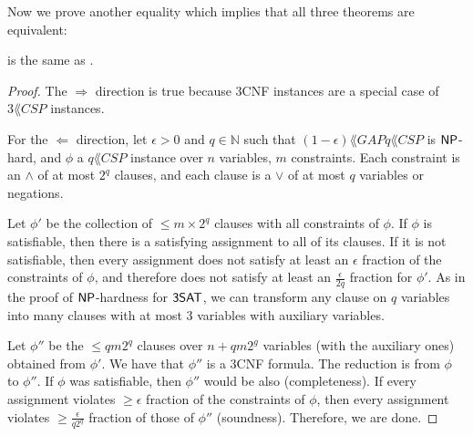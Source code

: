 \begin{definition}
Now we prove another equality which implies that all three theorems are equivalent:

\begin{theorem}
 is the same as .
\end{theorem}

\begin{proof}
The $\Rightarrow$ direction is true because 3CNF instances are a special case of $3\lang{CSP}$ instances.

\par For the $\Leftarrow$ direction, let $\epsilon > 0$ and $q \in \mathbb{N}$ such that $(1-\epsilon)\lang{GAP}q\lang{CSP}$ is ${\mathsf{NP}}$-hard, and $\phi$ a $q\lang{CSP}$ instance over $n$ variables, $m$ constraints. Each constraint is an $\wedge$ of at most $2^q$ clauses, and each clause is a $\vee$ of at most $q$ variables or negations.

\par Let $\phi'$ be the collection of $\le m\times 2^q$ clauses with all constraints of $\phi$. If $\phi$ is satisfiable, then there is a satisfying assignment to all of its clauses. If it is not satisfiable, then every assignment does not satisfy at least an $\epsilon$ fraction of the constraints of $\phi$, and therefore does not satisfy at least an $\frac{\epsilon}{2q}$ fraction for $\phi'$. As in the proof of ${\mathsf{NP}}$-hardness for ${\mathsf{3SAT}}$, we can transform any clause on $q$ variables into many clauses with at most 3 variables with auxiliary variables. 

\par Let $\phi''$ be the $\le qm2^q$ clauses over $n+qm2^g$ variables (with the auxiliary ones) obtained from $\phi'$. We have that $\phi''$ is a 3CNF formula. The reduction is from $\phi$ to $\phi''$. If $\phi$ was satisfiable, then $\phi''$ would be also (completeness). If every assignment violates $\ge \epsilon$ fraction of the constraints of $\phi$, then every assignment violates $\ge \frac{\epsilon}{q2^q}$ fraction of those of $\phi''$ (soundness). Therefore, we are done. 
\end{proof}

\end{definition}